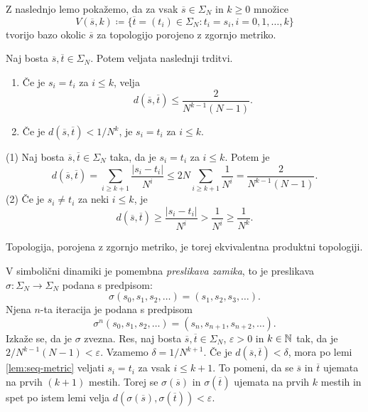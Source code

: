 %
\noindent Z naslednjo lemo pokažemo, da za vsak \(\overline{s} \in \Sigma_N\) in \(k \geq 0\) množice
\[V(\overline{s}, k) \coloneq \big\{ \overline{t} = (t_i) \in \Sigma_N : t_i = s_i, i = 0, 1, \dots, k \big\}\]
tvorijo bazo okolic \(\overline{s}\) za topologijo porojeno z zgornjo metriko.

\begin{lema} \label{lem:seq-metric}
    Naj bosta \(\overline{s}, \overline{t} \in \Sigma_N\). Potem veljata naslednji trditvi.
    \begin{enumerate}[label=(\arabic*)]
        \item Če je \(s_i = t_i\) za \(i \leq k\), velja \[d (\overline{s}, \overline{t}) \leq \frac{2}{N^{k - 1} (N - 1)}.\]
        \item Če je \(d (\overline{s}, \overline{t}) < 1 / N^k\), je \(s_i = t_i\) za \(i \leq k\).
    \end{enumerate}
\end{lema}

\begin{dokaz}
    (1) Naj bosta \(\overline{s}, \overline{t} \in \Sigma_N\) taka, da je \(s_i = t_i\) za \(i \leq k\). Potem je
    \[d (\overline{s}, \overline{t}) = \sum_{i \geq k + 1} \frac{|s_i - t_i|}{N^i} \leq 2 N \sum_{i \geq k + 1} \frac{1}{N^i} = \frac{2}{N^{k - 1} (N - 1)}.\]
    (2) Če je \(s_i \neq t_i\) za neki \(i \leq k\), je
    \[d (\overline{s}, \overline{t}) \geq \frac{|s_i - t_i|}{N^i} > \frac{1}{N^i} \geq \frac{1}{N^k}.\]
\end{dokaz}

\noindent Topologija, porojena z zgornjo metriko, je torej ekvivalentna produktni topologiji.

V simbolični dinamiki je pomembna \emph{preslikava zamika}, to je preslikava \(\sigma \colon \Sigma_N \to \Sigma_N\) podana s predpisom:
\[\sigma (s_0, s_1, s_2, \dots) = (s_1, s_2, s_3, \dots).\]
Njena \(n\)-ta iteracija je podana s predpisom
\[\sigma^n (s_0, s_1, s_2, \dots) = (s_n, s_{n + 1}, s_{n + 2}, \dots).\]
Izkaže se, da je \(\sigma\) zvezna. Res, naj bosta \(\overline{s}, \overline{t} \in \Sigma_N\), \(\varepsilon > 0\) in \(k \in \mathbb N\) tak, da je \(2 / N^{k - 1} (N - 1) < \varepsilon\). Vzamemo \(\delta = 1 / N^{k + 1}\). Če je \(d(\overline{s}, \overline{t}) < \delta\), mora po lemi \ref{lem:seq-metric} veljati \(s_i = t_i\) za vsak \(i \leq k + 1\). To pomeni, da se \(\overline{s}\) in \(\overline{t}\) ujemata na prvih \((k + 1)\) mestih. Torej se \(\sigma (\overline{s})\) in \(\sigma (\overline{t})\) ujemata na prvih \(k\) mestih in spet po istem lemi velja \(d (\sigma (\overline{s}), \sigma (\overline{t})) < \varepsilon\).

